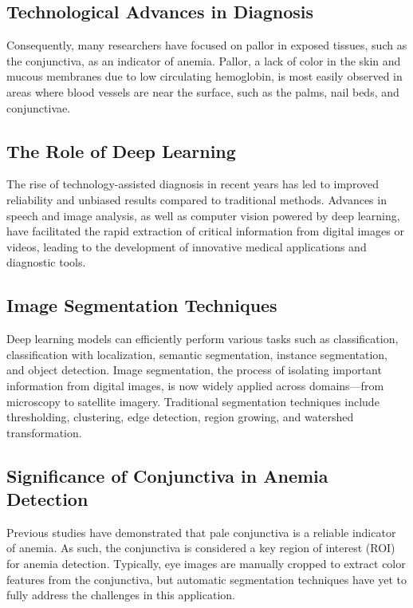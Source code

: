 \documentclass[conference]{IEEEtran}
\begin{document}
\subsection{\textbf{Technological Advances in Diagnosis}}
Consequently, many researchers have focused on pallor in exposed tissues, such as the conjunctiva, as an indicator of anemia. Pallor, a lack of color in the skin and mucous membranes due to low circulating hemoglobin, is most easily observed in areas where blood vessels are near the surface, such as the palms, nail beds, and conjunctivae. 

\subsection{\textbf{The Role of Deep Learning}}
The rise of technology-assisted diagnosis in recent years has led to improved reliability and unbiased results compared to traditional methods. Advances in speech and image analysis, as well as computer vision powered by deep learning, have facilitated the rapid extraction of critical information from digital images or videos, leading to the development of innovative medical applications and diagnostic tools.

\subsection{\textbf{Image Segmentation Techniques}}
Deep learning models can efficiently perform various tasks such as classification, classification with localization, semantic segmentation, instance segmentation, and object detection. Image segmentation, the process of isolating important information from digital images, is now widely applied across domains—from microscopy to satellite imagery. Traditional segmentation techniques include thresholding, clustering, edge detection, region growing, and watershed transformation.

\subsection{\textbf{Significance of Conjunctiva in Anemia Detection}}
Previous studies have demonstrated that pale conjunctiva is a reliable indicator of anemia. As such, the conjunctiva is considered a key region of interest (ROI) for anemia detection. Typically, eye images are manually cropped to extract color features from the conjunctiva, but automatic segmentation techniques have yet to fully address the challenges in this application.
\end{document}
